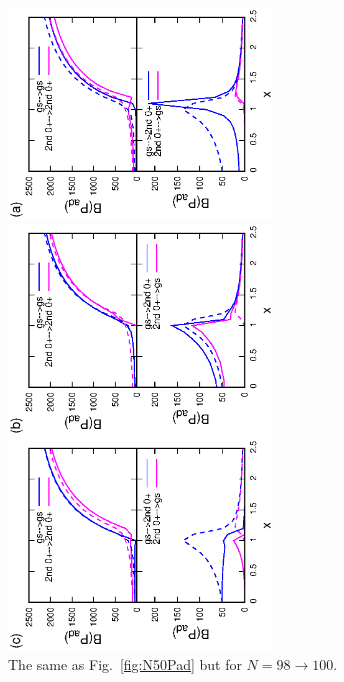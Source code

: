 \documentclass[%
superscriptaddress,
preprint,
showpacs,
nofootinbib,
amsmath,amssymb,
aps,
prc,
floatfix ]%
{revtex4-1}
\begin{document}
\begin{figure}[htbp]
 \begin{minipage}{0.3\hsize}
 \begin{center}
  \includegraphics[width=70mm,angle=-90]{N100Pad_CQ.eps}
 \end{center}
 \captionsetup{labelformat=empty,labelsep=none}
 \end{minipage}
 \begin{minipage}{0.3\hsize}
 \begin{center}
  \includegraphics[width=70mm,angle=-90]{N100Pad_FD.eps}
 \end{center}
 \captionsetup{labelformat=empty,labelsep=none}
 \end{minipage}
 \begin{minipage}{0.3\hsize}
 \begin{center}
  \includegraphics[width=70mm,angle=-90]{N100Pad_SPA.eps}
 \end{center}
 \captionsetup{labelformat=empty,labelsep=none}
 \end{minipage}
 \caption{
The same as Fig.~\ref{fig:N50Pad} but for $N=98\rightarrow 100$.
}
 \label{fig:N100Pad}
\end{figure}
\end{document}
